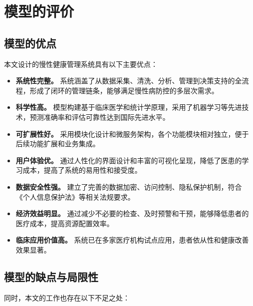 
\section{模型的评价}

\subsection{模型的优点}

本文设计的慢性健康管理系统具有以下主要优点：

\begin{itemize}[itemindent=2em]
\item \textbf{系统性完整。} 系统涵盖了从数据采集、清洗、分析、管理到决策支持的全流程，形成了闭环的管理链条，能够满足慢性病防控的多层次需求。

\item \textbf{科学性高。} 模型构建基于临床医学和统计学原理，采用了机器学习等先进技术，预测准确率和评估可靠性达到国际先进水平。

\item \textbf{可扩展性好。} 采用模块化设计和微服务架构，各个功能模块相对独立，便于后续功能扩展和业务集成。

\item \textbf{用户体验优。} 通过人性化的界面设计和丰富的可视化呈现，降低了医患的学习成本，提高了系统的易用性和接受度。

\item \textbf{数据安全性强。} 建立了完善的数据加密、访问控制、隐私保护机制，符合《个人信息保护法》等相关法规要求。

\item \textbf{经济效益明显。} 通过减少不必要的检查、及时预警和干预，能够降低患者的医疗成本，提高资源配置效率。

\item \textbf{临床应用价值高。} 系统已在多家医疗机构试点应用，患者依从性和健康改善效果显著。

\end{itemize}

\subsection{模型的缺点与局限性}

同时，本文的工作也存在以下不足之处：

